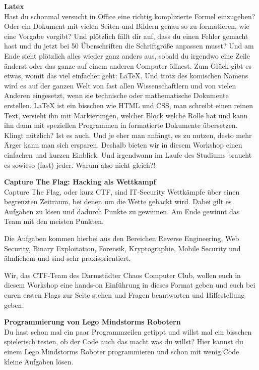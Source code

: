 {    \textbf{Latex}\\
    Hast du schonmal versucht in Office eine richtig komplizierte Formel einzugeben?
    Oder ein Dokument mit vielen Seiten und Bildern genau so zu formatieren, wie eine
    Vorgabe vorgibt? Und plötzlich fällt dir auf, dass du einen Fehler gemacht hast
    und du jetzt bei 50 Überschriften die Schriftgröße anpassen musst? Und am Ende sieht
    plötzlich alles wieder ganz anders aus, sobald du irgendwo eine Zeile änderst oder
    das ganze auf einem anderen Computer öffnest. Zum Glück gibt es etwas, womit das
    viel einfacher geht: LaTeX. Und trotz des komischen Namens wird es auf der ganzen
    Welt von fast allen Wissenschaftlern und von vielen Anderen eingesetzt, wenn sie
    technische oder mathematische Dokumente erstellen. LaTeX ist ein bisschen wie HTML
    und CSS, man schreibt einen reinen Text, versieht ihn mit Markierungen, welcher
    Block welche Rolle hat und kann ihn dann mit speziellen Programmen in formatierte
    Dokumente übersetzen. Klingt nützlich? Ist es auch. Und je eher man anfängt, es zu
    nutzen, desto mehr Ärger kann man sich ersparen. Deshalb bieten wir in diesem Workshop
    einen einfachen und kurzen Einblick. Und irgendwann im Laufe des Studiums braucht
    es sowieso (fast) jeder. Warum also nicht gleich?!


    \textbf{Capture The Flag: Hacking als Wettkampf}\\
    Capture The Flag, oder kurz CTF, sind IT-Security Wettkämpfe über einen begrenzten Zeitraum, bei denen um die Wette gehackt wird.
    Dabei gilt es Aufgaben zu lösen und dadurch Punkte zu gewinnen. Am Ende gewinnt das Team mit den meisten Punkten.

    Die Aufgaben kommen hierbei aus den Bereichen Reverse Engineering, Web Security, Binary Exploitation, Forensik, Kryptographie, Mobile Security und ähnlichem und sind sehr praxisorientiert.

    Wir, das CTF-Team des Darmstädter Chaos Computer Club, wollen euch in diesem Workshop eine hands-on Einführung in dieses Format geben und euch bei euren ersten Flags zur Seite stehen und Fragen beantworten und Hilfestellung geben.

    \textbf{Programmierung von Lego Mindstorms Robotern}\\
    Du hast schon mal ein paar Programmzeilen getippt und willst mal ein bisschen spielerisch testen, ob der Code auch das macht was du willst?
    Hier kannst du einem Lego Mindstorms Roboter programmieren und schon mit wenig Code kleine Aufgaben lösen.

}

